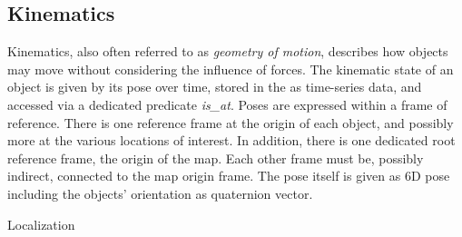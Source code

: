 \subsection{Kinematics}

Kinematics, also often referred to as \emph{geometry of motion}, describes how objects may move without considering the influence of forces.
The kinematic state of an object is given by its pose over time, stored in the \neemexp as time-series data, and accessed via a dedicated predicate \emph{is\_at}.
Poses are expressed within a frame of reference.
There is one reference frame at the origin of each object, and possibly more at the various locations of interest.
In addition, there is one dedicated root reference frame, the origin of the map.
Each other frame must be, possibly indirect, connected to the map origin frame.
The pose itself is given as 6D pose including the objects' orientation as quaternion vector.

\begin{ODP}{Localization}
\end{ODP}

